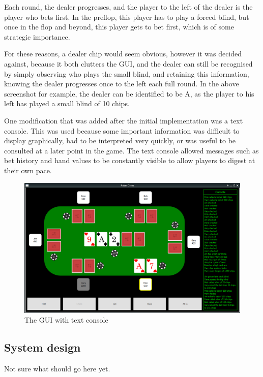 Each round, the dealer progresses, and the player to
the left of the dealer is the player who bets first. In the preflop, this
player has to play a forced blind, but once in the flop and beyond, this player
gets to bet first, which is of some strategic importance. 

For these reasons, a dealer chip would seem obvious, however it was decided
against, because it both clutters the GUI, and the dealer can still be
recognised by simply observing who plays the small blind, and retaining this
information, knowing the dealer progresses once to the left each full round.
In the above screenshot for example, the dealer can be identified to be A,
as the player to his left has played a small blind of 10 chips.

One modification that was added after the initial implementation was a text
console. This was used because some important information was difficult to 
display graphically, had to be interpreted very quickly, or was useful to be 
consulted at a later point in the game. The text console allowed messages such 
as bet history and hand values to be constantly visible to allow players to 
digest at their own pace.

\begin{figure}[H]
    \centering
    \includegraphics[width=\textwidth]{../images/guiwithconsole.png}
    \caption{The GUI with text console}%
    \label{fig:guiwithconsole}
\end{figure}

\newpage{}

\subsection{System design}

Not sure what should go here yet.


